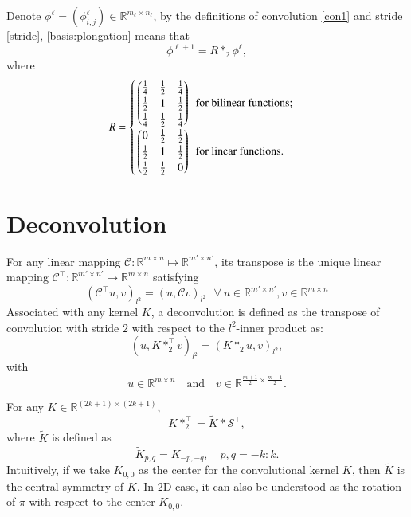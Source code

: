 Denote $\phi^{\ell}=(\phi^{\ell}_{i,j})\in \mathbb R^{m_{\ell}\times n_{\ell}}$, 
by the definitions of convolution \eqref{con1} and stride \eqref{stride}, \eqref{basis:plongation} means that
$$
 \phi^{\ell+1}=R\ast_2 \phi^{{\ell}},
$$
where 
\begin{equation}\label{bi-restrict}
R=
\begin{cases}
	\begin{pmatrix}
	\frac{1}{4} &\frac{1}{2}&\frac{1}{4}\\
	\frac{1}{2}& 1&\frac{1}{2}\\
	\frac{1}{4}&\frac{1}{2}&  \frac{1}{4} 
	\end{pmatrix}
	\hbox{~~for bilinear functions};\\
	\begin{pmatrix}
	0 &\frac{1}{2}&\frac{1}{2}\\
	\frac{1}{2}& 1&\frac{1}{2}\\
	\frac{1}{2}&\frac{1}{2}&  0
	\end{pmatrix}
	\hbox{~~for linear functions}.
	\end{cases}
	\end{equation}		
\section{Deconvolution}
For any linear mapping $\mathcal C: \mathbb{R}^{m\times n} \mapsto \mathbb{R}^{m'\times n'}$, 
its transpose is the unique linear mapping $\mathcal C^\top: \mathbb{R}^{m'\times n'} \mapsto \mathbb{R}^{m\times n}$
satisfying 
$$
(\mathcal C^\top u, v)_{l^2}=(u, \mathcal C v)_{l^2}~~~\forall~u\in \mathbb{R}^{m'\times n'} , v\in \mathbb{R}^{m\times n}
$$
Associated with any kernel $K$, a deconvolution is defined as the transpose of convolution 
with stride $2$ with respect to the $l^2$-inner product as:
\begin{equation}\label{eq:def_deconv}
 (u, K \ast_2^\top v)_{l^2}=(K \ast_2 u, v)_{l^2},
\end{equation}
with
\begin{equation}
u \in \mathbb{R}^{m \times n} \quad \text{and} \quad v \in \mathbb{R}^{\frac{m+1}{2} \times \frac{m+1}{2}}.
\end{equation}

\begin{lemma}\label{lemm:tilde-K}
For any $K \in \mathbb{R}^{(2k+1) \times (2k+1)}$,
\begin{equation}\label{eq:}
K\ast_2^\top = {\tilde K}\ast \mathcal S^\top,
\end{equation}
where $\tilde K$ is defined as
\begin{equation}\label{eq:def_tildeK}
\tilde K_{p,q} = K_{-p, -q}, \quad p,q = -k:k.
\end{equation}
Intuitively, if we take $K_{0,0}$ as the center for the convolutional kernel $K$, 
then $\tilde K$ is the central symmetry of $K$. 
In 2D case, it can also be understood as the rotation of $\pi$ with respect to
the center $K_{0,0}$.
\end{lemma}


